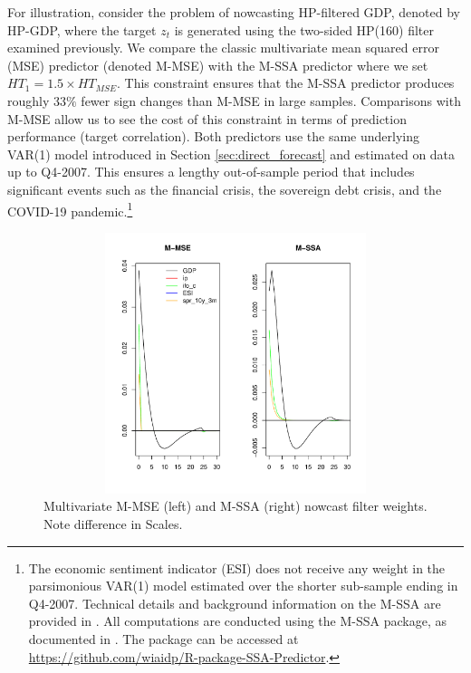 \documentclass[11pt,a4paper]{article}
\begin{document}
For illustration, consider the problem of nowcasting HP-filtered GDP, denoted by HP-GDP, where the target $z_t$ is generated using the two-sided HP(160) filter examined previously. We compare the classic multivariate mean squared error (MSE) predictor (denoted M-MSE) with the M-SSA predictor where we set $HT_1=1.5\times HT_{MSE}$. This constraint ensures that the M-SSA predictor produces roughly 33$\%$ fewer sign changes than M-MSE in large samples. Comparisons with M-MSE allow us to see the cost of this constraint in terms of prediction performance (target correlation). 
Both predictors use the same underlying VAR(1) model introduced in Section \ref{sec:direct_forecast} and estimated on data up to Q4-2007. This ensures a lengthy out-of-sample period that includes significant events such as the financial crisis, the sovereign debt crisis, and the COVID-19 pandemic.\footnote{The economic sentiment indicator (ESI) does not receive any weight in the parsimonious VAR(1) model estimated over the shorter sub-sample ending in Q4-2007. Technical details and background information on the M-SSA are provided in \cite{Wildi2025}. All computations are conducted using the M-SSA package, as documented in \cite{Wildi2025}. The package can be accessed at \url{https://github.com/wiaidp/R-package-SSA-Predictor}.}

\begin{figure}[htpb]
    \begin{center}
        \includegraphics[height=3in, width=4.5in]{./Figures/bk_gammak.pdf}
        \caption{Multivariate M-MSE (left) and M-SSA (right) nowcast filter weights.\\
        Note difference in Scales.
        \label{bk_gammak}}
    \end{center}
\end{figure}
\end{document}
